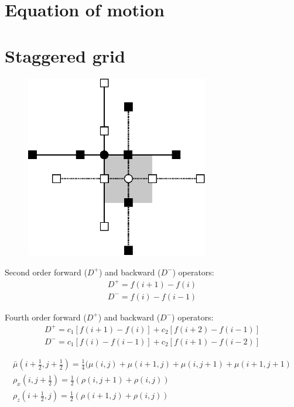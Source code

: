 \documentclass{gnulike}
\begin{document}
\section{Equation of motion}

\section{Staggered grid}

\cite{virieux1986psv,levander1988fourth}

\begin{figure}[!ht]
  \centering
  \includegraphics[width=8cm]{fig/staggered.eps}
\end{figure}

\noindent Second order forward ($D^{+}$) and backward ($D^{-}$) operators:
\begin{eqnarray}
  D^{+}=f(i+1)-f(i) \nonumber \\
  D^{-}=f(i)-f(i-1)
\end{eqnarray}

\noindent Fourth order forward ($D^{+}$) and backward ($D^{-}$) operators:
\begin{eqnarray}
  D^{+}=c_{1}[f(i+1)-f(i)]+c_{2}[f(i+2)-f(i-1)] \nonumber \\
  D^{-}=c_{1}[f(i)-f(i-1)]+c_{2}[f(i+1)-f(i-2)]
\end{eqnarray}

\begin{eqnarray}
  \bar{\mu}(i+\frac{1}{2}, j+\frac{1}{2})=\frac{1}{4}(\mu(i,j)+\mu(i+1,j)+\mu(i,j+1)+\mu(i+1,j+1) \\
  \rho_{x}(i,j+\frac{1}{2}) = \frac{1}{2}(\rho (i,j+1)+\rho(i,j)) \\
  \rho_{z}(i+\frac{1}{2},j) = \frac{1}{2}(\rho (i+1,j)+\rho(i,j))
\end{eqnarray}
\end{document}
